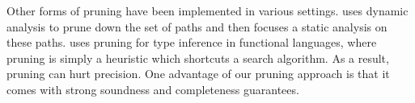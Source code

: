 Other forms of pruning have been implemented in various settings.
\cite{vipindeep05pruning} uses dynamic analysis to prune down the set of paths and
then focuses a static analysis on these paths.
\cite{spoon04ddp} uses pruning for type inference in functional languages,
where pruning is simply a heuristic which shortcuts a search algorithm.
As a result, pruning can hurt precision.
One advantage of our pruning approach is that it comes with strong soundness
and completeness guarantees.

